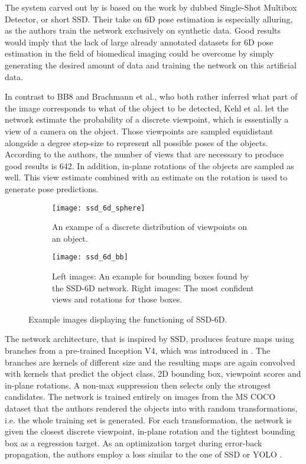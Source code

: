 The system carved out by \cite{ssd-6d} is based on the work by \cite{ssd} dubbed Single-Shot Multibox Detector, or short SSD. Their take on 6D pose estimation is especially alluring, as the authors train the network exclusively on synthetic data. Good results would imply that the lack of large already annotated datasets for 6D pose estimation in the field of biomedical imaging could be overcome by simply generating the desired amount of data and training the network on this artificial data. 

In contrast to BB8 and Brachmann et al., who both rather inferred what part of the image corresponds to what of the object to be detected, Kehl et al. let the network estimate the probability of a discrete viewpoint, which is essentially a view of a camera on the object. Those viewpoints are sampled equidistant alongside a degree step-size to represent all possible poses of the objects. According to the authors, the number of views that are necessary to produce good results is 642. In addition, in-plane rotations of the objects are sampled as well. This view estimate combined with an estimate on the rotation is used to generate pose predictions. 

\begin{figure}[!tbp]
	\centering
	\begin{subfigure}[b]{0.5\textwidth}
		\centering
    	\texttt{[image: ssd\_6d\_sphere]}
    	\caption{An exampe of a discrete distribution of viewpoints on an object. \cite{ssd-6d}}
	\end{subfigure}
	\hfill
	\begin{subfigure}[b]{0.4\textwidth}
		\centering
    	\texttt{[image: ssd\_6d\_bb]}
    	\caption{Left images: An example for bounding boxes found by the SSD-6D network. Right images: The most confident views and rotations for those boxes.  \cite{ssd-6d}}
	\end{subfigure}
	\caption{Example images displaying the functioning of SSD-6D. \cite{ssd-6d}}
\end{figure}

The network architecture, that is inspired by SSD, produces feature maps using branches from a pre-trained Inception V4, which was introduced in \cite{inceptionv4}. The branches are kernels of different size and the resulting maps are again convolved with kernels that predict the object class, 2D bounding box, viewpoint scores and in-plane rotations. A non-max suppression then selects only the strongest candidates. The network is trained entirely on images from the MS COCO dataset \cite{mscoco} that the authors rendered the objects into with random transformations, i.e. the whole training set is generated. For each transformation, the network is given the closest discrete viewpoint, in-plane rotation and the tightest bounding box as a regression target. As an optimization target during error-back propagation, the authors employ a loss similar to the one of SSD \cite{ssd} or YOLO \cite{yolo}. 

